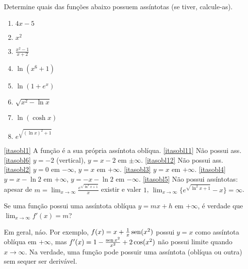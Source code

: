 \begin{exo}
Determine quais das funções abaixo possuem assíntotas
 (se tiver, calcule-as).
\begin{multicols}{3}
\begin{enumerate}
\item\label{itasobl1} $4x-5$
\item\label{itasobl11} $x^2$
\item\label{itasobl6} $\frac{x^2-1}{x+2}$
\item\label{itasobl12} $\ln( x^6+1)$
\item\label{itasobl2} $\ln(1+e^x)$
\item\label{itasobl3} $\sqrt{x^2-\ln x}$
\item\label{itasobl4} $\ln(\cosh x)$
\item\label{itasobl5} $e^{\sqrt{(\ln x)^2+1}}$
\end{enumerate}
\end{multicols}
\vspace{0.01cm}
\begin{sol}
\eqref{itasobl1} A função é a sua própria assíntota oblíqua.
\eqref{itasobl11} Não possui ass.
\eqref{itasobl6} $y=-2$ (vertical), $y=x-2$ em $\pm\infty$. 
\eqref{itasobl12} Não possui ass.
\eqref{itasobl2} $y=0$ em $-\infty$, $y=x$ em $+\infty$.
\eqref{itasobl3} $y=x$ em $+\infty$.
\eqref{itasobl4} $y=x-\ln 2$ em $+\infty$, $y=-x-\ln 2$ em
$-\infty$.
\eqref{itasobl5} Não possui assíntotas: apesar de
$m=\lim_{x\to \infty}\frac{e^{\sqrt{\ln^2x+1}}}{x}$
existir e valer $1$,
$\lim_{x\to\infty}\{e^{\sqrt{\ln^2x+1}}-x\}=\infty$. 
\end{sol}
\end{exo}

\begin{exo}
Se uma função possui uma assíntota oblíqua $y=mx+h$ em
$+\infty$, é
verdade que $\lim_{x\to\infty}f'(x)=m$?
\begin{sol}
Em geral, náo. 
Por exemplo, $f(x)=x+\tfrac{1}{x}\operatorname{sen} (x^2)$ possui $y=x$ como assíntota
oblíqua em $+\infty$, 
mas $f'(x)=1-\frac{\operatorname{sen} x^2}{x^2}+2\cos (x^2)$ 
não possui limite quando $x\to\infty$.
Na verdade, uma função pode possuir uma assíntota (oblíqua ou
outra)
sem sequer ser derivável.
\end{sol}
\end{exo}

